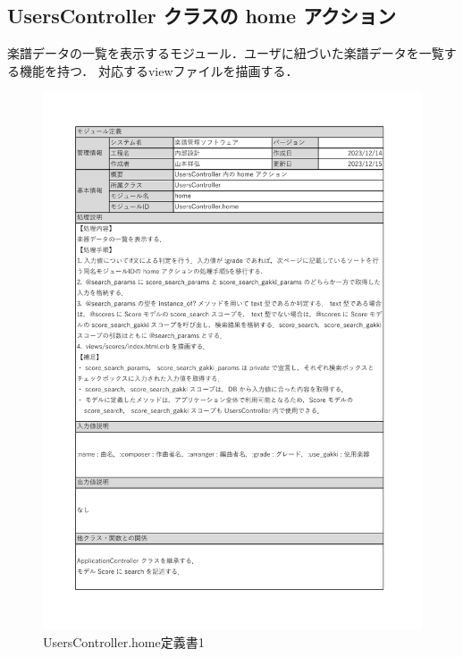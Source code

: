 \subsection*{UsersController クラスの home アクション}
楽譜データの一覧を表示するモジュール．ユーザに紐づいた楽譜データを一覧する機能を持つ．
対応するviewファイルを描画する．
\begin{figure}[H]
	\centering
	\includegraphics[scale=0.6]{img/Users/xlsx/UsersController.home_1.pdf}
	\vspace{-1cm}
	\caption{UsersController.home定義書1}
\end{figure}
